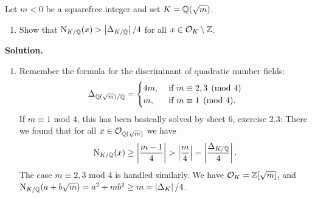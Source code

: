 \documentclass[a4paper,11pt]{article}
\begin{document}
Let $m<0$ be a squarefree integer and set $K =\mathbb{Q}(\sqrt m)$.
\begin{enumerate}
    \item Show that $\operatorname{N}_{K/\mathbb{Q}}(x) > \left\lvert \Delta_{K/\mathbb{Q}} \right\rvert/4$ for all $x \in \mathcal{O}_K\setminus \mathbb{Z}$. 
\end{enumerate}
\textbf{Solution.}
\begin{enumerate}[labelindent=0pt, wide]
    \item Remember the formula for the discriminant of quadratic number fields:
        \begin{equation*}
            \Delta_{\mathbb{Q}(\sqrt {m})/\mathbb{Q}} = \begin{cases}
                4m, &\text{ if }m \equiv 2,3 \pmod 4\\
                m, &\text{ if }m \equiv 1 \pmod 4.
            \end{cases}
        \end{equation*}
        If $m \equiv 1$ mod $4$, this has been basically solved by sheet 6, exercise 2.3:
        There we found that for all $x \in \mathcal{O}_{\mathbb{Q}(\sqrt m)}$ we have
        $$\operatorname{N}_{K/\mathbb{Q}}(x) \geq \left\lvert \frac{m-1}4 \right\rvert > \left\lvert \frac m4 \right\rvert=
        \left\lvert \frac{\Delta_{K/\mathbb{Q}}}4 \right\rvert.$$ 
        The case $m \equiv 2,3$ mod $4$ is handled similarly. We have $\mathcal{O}_K =
        \mathbb{Z}[\sqrt m]$, and $\operatorname{N}_{K/\mathbb{Q}}(a + b\sqrt m) = a^2 + mb^2 \geq m = \left\lvert \Delta_K \right\rvert/4$.

\end{enumerate}
\end{document}
